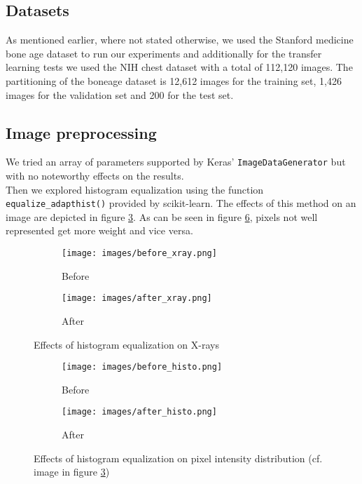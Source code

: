 \documentclass[10pt,twocolumn,letterpaper]{article}
\begin{document}
\subsection{Datasets}
As mentioned earlier, where not stated otherwise, we used the Stanford medicine bone age dataset \cite{stanfordboneage} to run our experiments and additionally for the transfer learning tests we used the NIH chest dataset \cite{nihchestxray} with a total of 112,120 images. The partitioning of the boneage dataset is 12,612 images for the training set, 1,426 images for the validation set and 200 for the test set.

\subsection{Image preprocessing}
We tried an array of parameters supported by Keras' \verb+ImageDataGenerator+ but with no noteworthy effects on the results.\\
Then we explored histogram equalization using the function \verb+equalize_adapthist()+ provided by scikit-learn. The effects of this method on an image are depicted in figure \ref{fig:fighistx}. As can be seen in figure \ref{fig:fighistd}, pixels not well represented get more weight and vice versa.

\begin{figure}[h]
\centering
\begin{subfigure}{0.2\textwidth}
\texttt{[image: images/before\_xray.png]} 
\caption{Before}
\label{fig:subim1}
\end{subfigure}
\begin{subfigure}{0.2\textwidth}
\texttt{[image: images/after\_xray.png]}
\caption{After}
\label{fig:subim2}
\end{subfigure}
\caption{Effects of histogram equalization on X-rays}
\label{fig:fighistx}
\end{figure}

\begin{figure}[h]
\centering
\begin{subfigure}{0.2\textwidth}
\texttt{[image: images/before\_histo.png]} 
\caption{Before}
\label{fig:subim1}
\end{subfigure}
\begin{subfigure}{0.2\textwidth}
\texttt{[image: images/after\_histo.png]}
\caption{After}
\label{fig:subim2}
\end{subfigure}
\caption{Effects of histogram equalization on pixel intensity distribution (cf. image in figure \ref{fig:fighistx})}
\label{fig:fighistd}
\end{figure}
\end{document}
